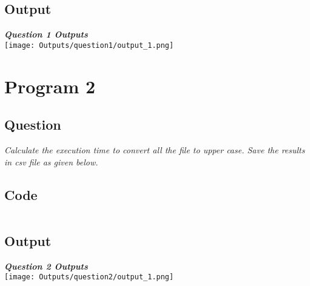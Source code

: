 \documentclass{article}
\begin{document}
\subsection{Output}
\begin{center}
    {\Large \textbf{\textit{Question 1 Outputs}}}\\
    \vspace{1.5cm}
    {\texttt{[image: Outputs/question1/output\_1.png]}}\\
    \vspace{1.5cm}
\end{center}
\pagebreak

\section{Program 2}
\subsection{Question}
	{\large \textit { 
Calculate the execution time to convert all the file to upper case. Save the results
in csv file as given below.}\par}
\subsection{Code}
\inputminted[frame=lines,linenos]
{python}{Codes/question2/main.py}
\subsection{Output}
\begin{center}
    {\Large \textbf{\textit{Question 2 Outputs}}}\\
    \vspace{1.5cm}
    {\texttt{[image: Outputs/question2/output\_1.png]}}\\
    \vspace{1.5cm}
\end{center}
\pagebreak
\end{document}
